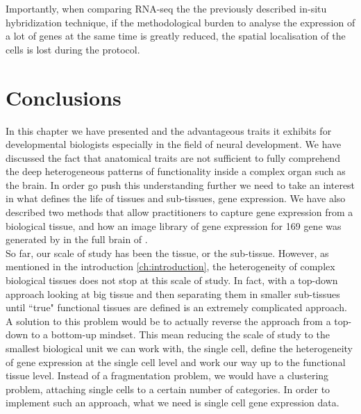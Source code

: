     Importantly, when comparing RNA-seq the the previously described in-situ hybridization technique, if the methodological burden to analyse the expression of a lot of genes at the same time is greatly reduced, the spatial localisation of the cells is lost during the protocol.\\
    
\section{Conclusions}
     
     In this chapter we have presented \platyfull{} and the advantageous traits it exhibits for developmental biologists especially in the field of neural development. We have discussed the fact that anatomical traits are not sufficient to fully comprehend the deep heterogeneous patterns of functionality inside a complex organ such as the brain. In order go push this understanding further we need to take an interest in what defines the life of tissues and sub-tissues, gene expression. We have also described two methods that allow practitioners to capture gene expression from a biological tissue, and how an image library  of gene expression for 169 gene was generated by \cite{Tomer10} in the full brain of \platy{}.\\
     
	So far, our scale of study has been the tissue, or the sub-tissue. However, as mentioned in the introduction \ref{ch:introduction}, the heterogeneity of complex biological tissues does not stop at this scale of study. In fact, with a top-down approach looking at big tissue and then separating them in smaller sub-tissues until ``true" functional tissues are defined is an extremely complicated approach. A solution to this problem would be to actually reverse the approach from a top-down to a bottom-up mindset. This mean reducing the scale of study to the smallest biological unit we can work with, the single cell, define the heterogeneity of gene expression at the single cell level and work our way up to the functional tissue level. Instead of a fragmentation problem, we would have a clustering problem, attaching single cells to a certain number of categories. In order to implement such an approach, what we need is single cell gene expression data.

%
%
%
%
%




